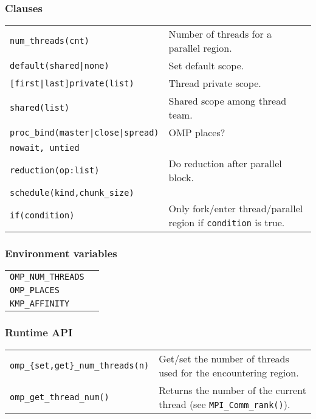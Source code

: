 \documentclass[11pt]{article}
\begin{document}
\subsubsection{Clauses}

\begin{tabular}{ p{7cm} p{9cm} }
	\lstinline$num_threads(cnt)$ & Number of threads for a parallel region. \\
	\lstinline$default(shared|none)$ & Set default scope. \\
	\lstinline$[first|last]private(list)$ & Thread private scope. \\
	\lstinline$shared(list)$ & Shared scope among thread team. \\
	\lstinline$proc_bind(master|close|spread)$ & OMP places? \\
	\lstinline$nowait, untied$ & \\
	\lstinline$reduction(op:list)$ & Do reduction after parallel block. \\
	\lstinline$schedule(kind,chunk_size)$ & \\
	\lstinline$if(condition)$ & Only fork/enter thread/parallel region if \texttt{condition} is true. \\
\end{tabular}

\subsubsection{Environment variables}

\begin{tabular}{ p{7cm} l }
	\lstinline$OMP_NUM_THREADS$ & \\
	\lstinline$OMP_PLACES$ & \\
	\lstinline$KMP_AFFINITY$ & \\
\end{tabular}

\subsubsection{Runtime API}

\begin{tabular}{ p{7cm} p{9cm} }
	\lstinline$omp_{set,get}_num_threads(n)$ & Get/set the number of threads used for the encountering region. \\
	\lstinline$omp_get_thread_num()$ & Returns the number of the current thread (see \lstinline$MPI_Comm_rank()$).
	
\end{tabular}
\end{document}
